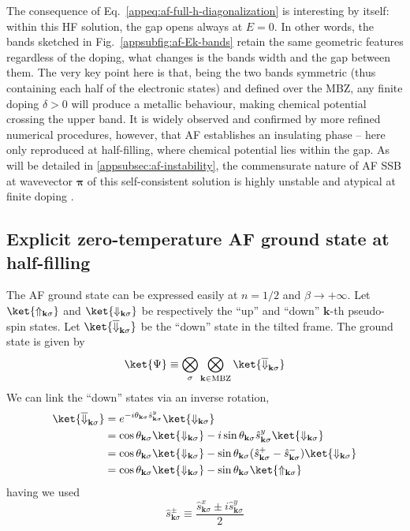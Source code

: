 The consequence of Eq.~\eqref{appeq:af-full-h-diagonalization} is interesting by itself: within this HF solution, the gap opens always at $E=0$. In other words, the bands sketched in Fig.~\ref{appsubfig:af-Ek-bands} retain the same geometric features regardless of the doping, what changes is the bands width and the gap between them. The very key point here is that, being the two bands symmetric (thus containing each half of the electronic states) and defined over the MBZ, any finite doping $\delta>0$ will produce a metallic behaviour, making chemical potential crossing the upper band. It is widely observed and confirmed by more refined numerical procedures, however, that AF establishes an insulating phase -- here only reproduced at half-filling, where chemical potential lies within the gap. As will be detailed in \ref{appsubsec:af-instability}, the commensurate nature of AF SSB at wavevector $\bm{\pi}$ of this self-consistent solution is highly unstable and atypical at finite doping \cite{singh1990collective}.

\subsection{Explicit zero-temperature AF ground state at half-filling}\label{appsubsec:af-zero-T-half-filling-gs}

The AF ground state can be expressed easily at $n=1/2$ and $\beta \to +\infty$. Let $\ket{\Uparrow_{\mathbf{k}\sigma}}$ and $\ket{\Downarrow_{\mathbf{k}\sigma}}$ be respectively the ``up'' and ``down'' $\mathbf{k}$-th pseudo-spin states. Let $\ket{\overline{\Downarrow}_{\mathbf{k}\sigma}}$ be the ``down'' state in the tilted frame. The ground state is given by
\begin{equation}\label{appeq:af-hm-gs-1}
	\ket{\Psi} \equiv \bigotimes_\sigma \bigotimes_{\mathbf{k}\in\mathrm{MBZ}} \ket{\overline{\Downarrow}_{\mathbf{k}\sigma}}
\end{equation}
We can link the ``down'' states via an inverse rotation,
\begin{align}
	\ket{\overline{\Downarrow}_{\mathbf{k}\sigma}} &= e^{-i\theta_{\mathbf{k}\sigma} \hat s_{\mathbf{k}\sigma}^y} \ket{\Downarrow_{\mathbf{k}\sigma}} \nonumber \\
	&= \cos \theta_{\mathbf{k}\sigma} \ket{\Downarrow_{\mathbf{k}\sigma}} - i \sin\theta_{\mathbf{k}\sigma} \hat s_{\mathbf{k}\sigma}^y \ket{\Downarrow_{\mathbf{k}\sigma}} \nonumber \\
	&= \cos \theta_{\mathbf{k}\sigma} \ket{\Downarrow_{\mathbf{k}\sigma}} - \sin\theta_{\mathbf{k}\sigma} (\hat s_{\mathbf{k}\sigma}^+ - \hat s_{\mathbf{k}\sigma}^-) \ket{\Downarrow_{\mathbf{k}\sigma}} \nonumber \\
	&= \cos \theta_{\mathbf{k}\sigma} \ket{\Downarrow_{\mathbf{k}\sigma}} - \sin\theta_{\mathbf{k}\sigma} \ket{\Uparrow_{\mathbf{k}\sigma}} \label{appeq:af-hm-tilted-down}
\end{align}
having we used
\[
	\hat s_{\mathbf{k}\sigma}^\pm \equiv \frac{\hat s_{\mathbf{k}\sigma}^x \pm i\hat s_{\mathbf{k}\sigma}^y}{2}
\]

